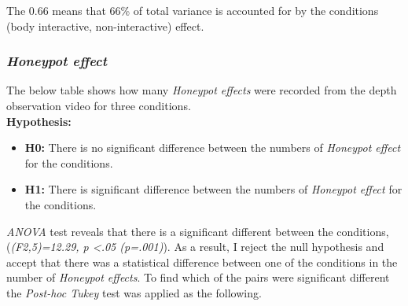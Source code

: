 The 0.66 means that 66\% of total variance is accounted for by the conditions (body interactive, non-interactive) effect.



\subsubsection {\emph{Honeypot effect}}
The below table shows how many \emph{Honeypot effects} were recorded from the depth observation video for three conditions.\\

\textbf{Hypothesis: }
\begin{itemize}
\item \textbf{H0:} There is no significant difference between the numbers of \emph{Honeypot effect} for the conditions.
\item \textbf{H1:} There is significant difference between the numbers of \emph{Honeypot effect} for the conditions.
\end{itemize}


\begin{table}[H]
\caption{Number of \emph{Honeypot effect} in three weeks}
\label{tab:landingeffectthreeweeks}
\centering
{}
\end{table}


\emph{ANOVA} test reveals that there is a significant different between the conditions,(\emph{(F2,5)=12.29, p <.05 (p=.001)}). As a result, I reject the null hypothesis and accept that there was a statistical difference between one of the conditions in the number of \emph{Honeypot effects}. To find which of the pairs were significant different the \emph{Post-hoc Tukey} test was applied as the following. 

